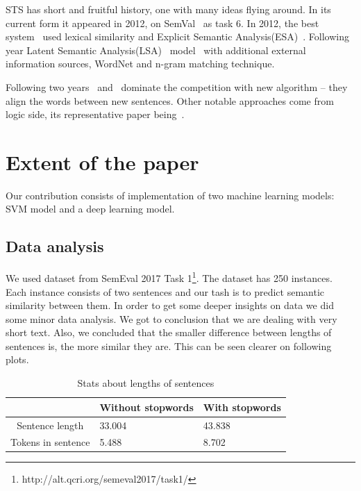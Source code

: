 \documentclass[10pt, a4paper]{article}
\begin{document}
STS has short and fruitful history, one with many ideas flying around. In its current form it appeared in 2012, on SemVal~\citep{agirre2012semeval} as task 6.  In 2012, the best system~\citep{bar2012ukp} used lexical similarity and Explicit Semantic Analysis(ESA)~\citep{gabrilovich2007computing}. Following year Latent Semantic Analysis(LSA)~\citep{deerwester1990indexing} model~\citep{han2013umbc} with additional external information sources, WordNet and n-gram matching technique.

Following two years~\citep{sultan2014dls} and~\citep{sultan2015dls} dominate the competition with new algorithm -- they align the words between new sentences. Other notable approaches come from logic side, its representative paper being~\citep{beltagy2014probabilistic}.

\section{Extent of the paper}

Our contribution consists of implementation of two machine learning models: SVM model and a deep learning model.

\subsection{Data analysis}
We used dataset from SemEval 2017
Task 1\footnote{http://alt.qcri.org/semeval2017/task1/}.
The dataset has 250 instances. Each instance consists of two sentences and our tash is to predict semantic similarity between them. In order to get some deeper insights on data we did some minor data analysis. We got to conclusion that we are dealing with very short text. Also, we concluded that the smaller difference between lengths of sentences is, the more similar they are. This can be seen clearer on following plots.

\begin{table}
\caption{Stats about lengths of sentences}
\label{tab:narrow-table}
\begin{center}
\begin{tabular}{cll}
\toprule
& Without stopwords & With stopwords \\
\midrule
Sentence length & 33.004 & 43.838 \\
Tokens in sentence & 5.488 & 8.702 \\
\bottomrule
\end{tabular}
\end{center}
\end{table}
\end{document}

